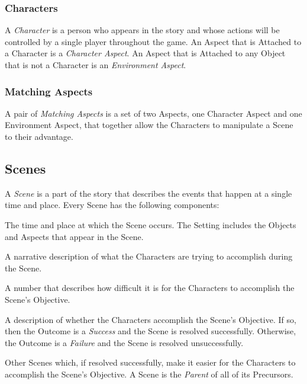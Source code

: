 \documentclass[12pt, a5paper, parskip=half-]{scrartcl}
\begin{document}
\subsubsection*{Characters}
A \emph{Character} is a person who appears in the story and whose actions will be controlled by a single player throughout the game.  An Aspect that is Attached to a Character is a \emph{Character Aspect}.
An Aspect that is Attached to any Object that is not a Character is an \emph{Environment Aspect}.

\subsubsection*{Matching Aspects}
A pair of \emph{Matching Aspects} is a set of two Aspects, one Character Aspect and one Environment Aspect, that together allow the Characters to manipulate a Scene to their advantage.

\newpage

\subsection*{Scenes}
A \emph{Scene} is a part of the story that describes the events that happen at a single time and place.
Every Scene has the following components:
\begin{description}[leftmargin=0pt]
  \item[\emph{Setting}]
  The time and place at which the Scene occurs. The Setting includes the Objects and Aspects that appear in the Scene.
  \item[\emph{Objective}]
    A narrative description of what the Characters are trying to accomplish during the Scene.
  \item[\emph{Difficulty Rating}]
    A number that describes how difficult it is for the Characters to accomplish the Scene's Objective.
  \item[\emph{Outcome}]
    A description of whether the Characters accomplish the Scene's Objective. If so, then the Outcome is a \emph{Success} and the Scene is resolved successfully. Otherwise, the Outcome is a \emph{Failure} and the Scene is resolved unsuccessfully.
  \item[\emph{Precursors}]
    Other Scenes which, if resolved successfully, make it easier for the Characters to accomplish the Scene's Objective. A Scene is the \emph{Parent} of all of its Precursors.
\end{description}


\newpage
\end{document}
